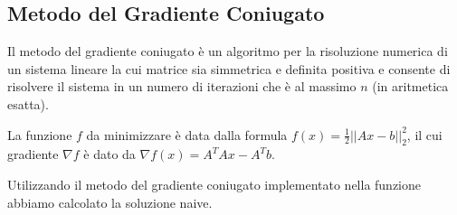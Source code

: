 {\color{oorange}\subsection{Metodo del Gradiente Coniugato}}
Il metodo del gradiente coniugato è un algoritmo per la risoluzione numerica di un sistema lineare la cui matrice 
sia simmetrica e definita positiva
 e consente di risolvere il sistema in un numero di iterazioni che è al massimo $n$ (in aritmetica esatta).

La funzione $f$ da minimizzare è data dalla formula
  $f(x) = \frac{1}{2} ||Ax - b||_2^2 $, il cui gradiente $\nabla f$ è dato da
$\nabla f(x) = A^TAx - A^Tb  $.

Utilizzando il metodo del gradiente coniugato implementato nella funzione 
 abbiamo calcolato la soluzione naive.

